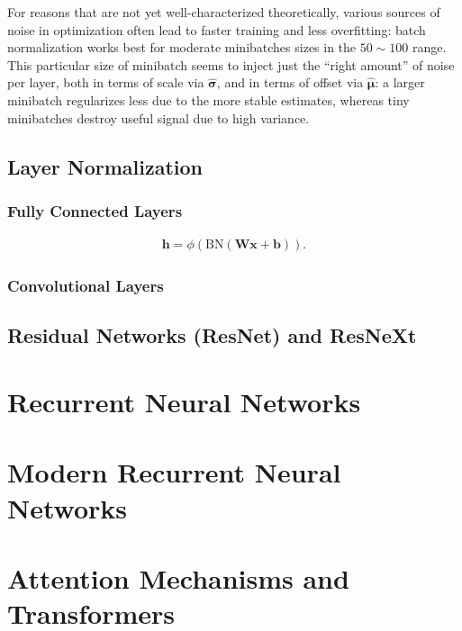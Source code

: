 \documentclass[a4paper,12pt]{article}
\theoremstyle{definition}
\begin{document}
For reasons that are not yet well-characterized theoretically, various sources of noise in optimization often lead to faster training and less overfitting:
batch normalization works best for moderate minibatches sizes in the $50 \sim 100$
range. This particular size of minibatch seems to inject just the “right amount” of noise per layer, both in terms of scale via $\hat{\boldsymbol{\sigma}}$, and in terms of offset
via $\hat{\boldsymbol{\mu}}$: a larger minibatch regularizes less due to the more stable estimates, whereas tiny minibatches destroy useful signal due to high variance.

\subsection*{Layer Normalization}

\subsubsection*{Fully Connected Layers}
\begin{equation*}
    \begin{aligned}
        \mathbf{h} = \phi(\mathrm{BN}(\mathbf{W}\mathbf{x} + \mathbf{b}) ).
    \end{aligned}
\end{equation*}

\subsubsection*{Convolutional Layers}


\subsection*{Residual Networks (ResNet) and ResNeXt}
\section{Recurrent Neural Networks}

\section{Modern Recurrent Neural Networks}

\section{Attention Mechanisms and Transformers}
\end{document}
